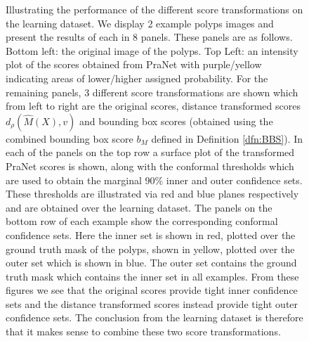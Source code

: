 \begin{figure}[h!]
	\caption{Illustrating the performance of the different score transformations on the learning dataset. We display 2 example polyps images and present the results of each in 8 panels. These panels are as follows. Bottom left: the original image of the polyps. Top Left: an intensity plot of the scores obtained from PraNet with purple/yellow indicating areas of lower/higher assigned probability. For the remaining panels, 3 different score transformations are shown which from left to right are the original scores, distance transformed scores $d_\rho(\hat{M}(X), v)$ and bounding box scores (obtained using the combined bounding box score $b_M$ defined in Definition \ref{dfn:BBS}). In each of the panels on the top row a surface plot of the transformed PraNet scores is shown, along with the conformal thresholds which are used to obtain the marginal 90\% inner and outer confidence sets.  These thresholds are illustrated via red and blue planes respectively and are obtained over the learning dataset. The panels on the bottom row of each example show the corresponding conformal confidence sets. Here the inner set is shown in red, plotted over the ground truth mask of the polyps, shown in yellow, plotted over the outer set which is shown in blue. The outer set contains the ground truth mask which contains the inner set in all examples. From these figures we see that the original scores provide tight inner confidence sets and the distance transformed scores instead provide tight outer confidence sets.
The conclusion from the learning dataset is therefore that it makes sense to combine these two score transformations.}
	\label{fig:learning}
\end{figure}
